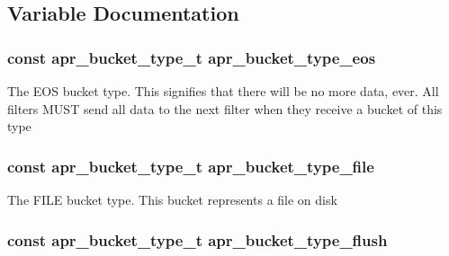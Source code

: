 \subsection{Variable Documentation}
\hypertarget{group___a_p_r___util___bucket___brigades_ga829cac9b4843b85a902ddd64dffbfb12}{
\subsubsection[{apr\-\_\-bucket\-\_\-type\-\_\-eos}]{\setlength{\rightskip}{0pt plus 5cm}const {\bf apr\-\_\-bucket\-\_\-type\-\_\-t} apr\-\_\-bucket\-\_\-type\-\_\-eos}}\label{group___a_p_r___util___bucket___brigades_ga829cac9b4843b85a902ddd64dffbfb12}
The E\-O\-S bucket type. This signifies that there will be no more data, ever. All filters M\-U\-S\-T send all data to the next filter when they receive a bucket of this type \hypertarget{group___a_p_r___util___bucket___brigades_ga5f17aa7e616179411a06475ec09626e9}{
\subsubsection[{apr\-\_\-bucket\-\_\-type\-\_\-file}]{\setlength{\rightskip}{0pt plus 5cm}const {\bf apr\-\_\-bucket\-\_\-type\-\_\-t} apr\-\_\-bucket\-\_\-type\-\_\-file}}\label{group___a_p_r___util___bucket___brigades_ga5f17aa7e616179411a06475ec09626e9}
The F\-I\-L\-E bucket type. This bucket represents a file on disk \hypertarget{group___a_p_r___util___bucket___brigades_gaecc113cfcc7751dfe70876437a2f51d7}{
\subsubsection[{apr\-\_\-bucket\-\_\-type\-\_\-flush}]{\setlength{\rightskip}{0pt plus 5cm}const {\bf apr\-\_\-bucket\-\_\-type\-\_\-t} apr\-\_\-bucket\-\_\-type\-\_\-flush}}\label{group___a_p_r___util___bucket___brigades_gaecc113cfcc7751dfe70876437a2f51d7}
